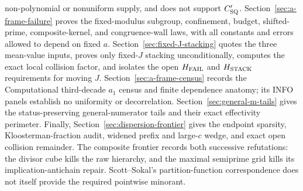 \documentclass[10pt,reqno]{amsart}
\theoremstyle{definition}
\newcommand{\1}{\mathbf 1}
\begin{document}
\begin{enumerate}[leftmargin=*,label=(\roman*)]
non-polynomial or nonuniform supply, and does not support $C_{\rm SQ}'$.
Section~\ref{sec:a-frame-failure} proves the fixed-modulus subgroup,
confinement, budget, shifted-prime, composite-kernel, and congruence-wall
laws, with all constants and errors allowed to depend on fixed $a$.
Section~\ref{sec:fixed-J-stacking} quotes the three mean-value inputs,
proves only fixed-$J$ stacking unconditionally, computes the exact local
collision factor, and isolates the open $H_{\rm FAIL}$ and $H_{\rm STACK}$
requirements for moving $J$.  Section~\ref{sec:a-frame-census} records the
Computational third-decade $a_1$ census and finite dependence anatomy; its
INFO panels establish no uniformity or decorrelation.  Section~\ref{sec:general-m-tails} gives the status-preserving
general-numerator tails and their exact
effectivity perimeter.  Finally,
Section~\ref{sec:dispersion-frontier}
gives the endpoint sparsity,
Kloosterman-fraction audit, widened prefix and large-$c$ wedge, and exact
open collision remainder.  The composite frontier records both successive
refutations: the divisor cube kills the raw hierarchy, and the maximal
semiprime grid kills its implication-antichain repair.  Scott--Sokal's
partition-function correspondence
\cite{ScottSokal} does not itself provide the required pointwise minorant.
\end{enumerate}
\end{document}
